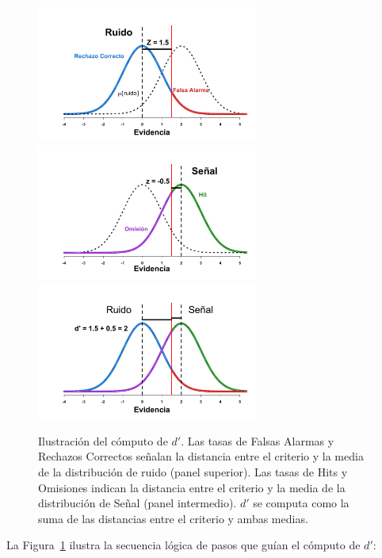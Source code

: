 \begin{itemize}
\begin{figure}[p]
\centering
\includegraphics[width=0.65\textwidth]{Figures/dR_1} 
\includegraphics[width=0.65\textwidth]{Figures/dR_2}
\includegraphics[width=0.65\textwidth]{Figures/dR_3}
\decoRule
\caption[Estimación paramétrica: la discriminabilidad ($d'$)]{Ilustración del cómputo de $d'$. Las tasas de Falsas Alarmas y Rechazos Correctos señalan la distancia entre el criterio y la media de la distribución de ruido (panel superior). Las tasas de Hits y Omisiones indican la distancia entre el criterio y la media de la distribución de Señal (panel intermedio). $d'$ se computa como la suma de las distancias entre el criterio y ambas medias.}
\label{fig:Graf_Discrim}
\end{figure}

La Figura~\ref{fig:Graf_Discrim} ilustra la secuencia lógica de pasos que guían el cómputo de $d'$:\\


\end{itemize}
